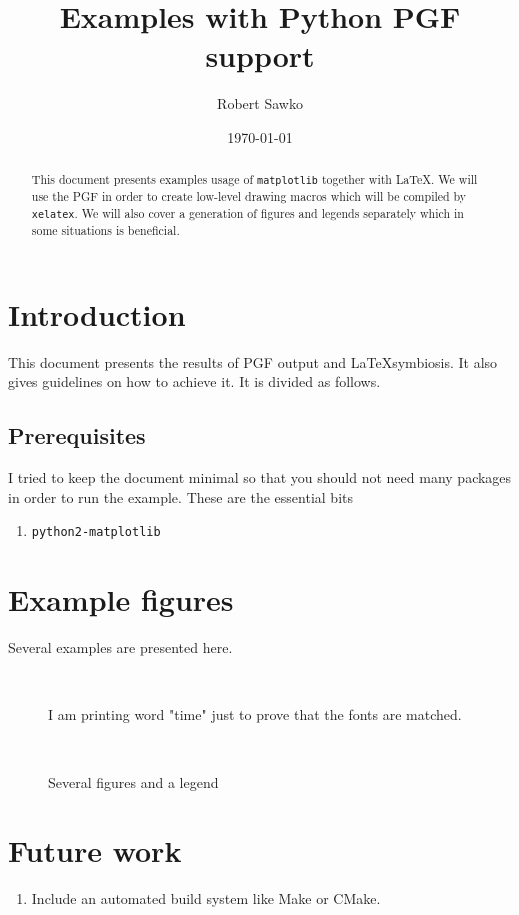 \documentclass[a4paper,12pt]{article}
\date{\today}
\author{Robert Sawko}
\affil{Department of Engineering Computing, Cranfield University}
\title{Examples with Python PGF support}
\begin{document}
\maketitle

\begin{abstract}

  This document presents examples usage of \texttt{matplotlib} together with
  \LaTeX. We will use the PGF in order to create low-level drawing macros which
  will be compiled by \texttt{xelatex}. We will also cover a generation of
  figures and legends separately which in some situations is beneficial. 
\end{abstract}

\section{Introduction}
This document presents the results of PGF output and \LaTeX symbiosis. It also
gives guidelines on how to achieve it. It is divided as follows.

\subsection{Prerequisites}
I tried to keep the document minimal so that you should not need many packages
in order to run the example. These are the essential bits
\begin{enumerate}
  \item \texttt{python2-matplotlib}
\end{enumerate}

\section{Example figures}

Several examples are presented here.

\begin{figure}[b] 
  \centering
   
  \\
  \caption{I am printing word "time" just to prove that the fonts are matched.}
  \label{fig:first} 
\end{figure}
\begin{figure}[b] 
  \centering
   
   
   
  \\
   
  \caption{Several figures and a legend}
  \label{fig:problem} 
\end{figure}

\section{Future work}
\begin{enumerate}
  \item Include an automated build system like Make or CMake.
\end{enumerate}
\end{document}
